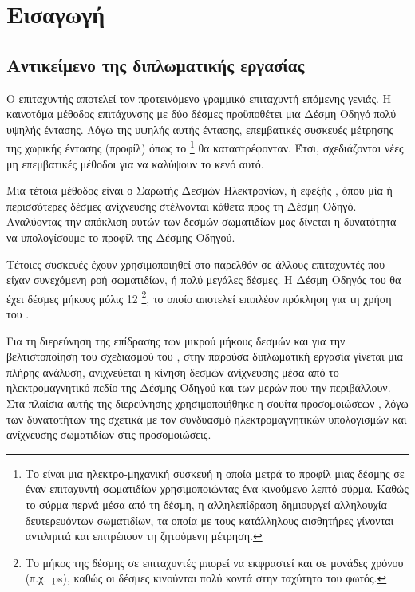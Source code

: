 \chapter{Εισαγωγή}


\epigraph{\textit{}}{}

\section{Αντικείμενο της διπλωματικής εργασίας}
Ο επιταχυντής  αποτελεί τον προτεινόμενο γραμμικό επιταχυντή επόμενης γενιάς.
Η καινοτόμα μέθοδος επιτάχυνσης με δύο δέσμες προϋποθέτει μια Δέσμη Οδηγό πολύ υψηλής έντασης.
Λόγω της υψηλής αυτής έντασης, επεμβατικές συσκευές μέτρησης της χωρικής έντασης (προφίλ) όπως το \footnote{Το  είναι μια ηλεκτρο-μηχανική συσκευή η οποία μετρά το προφίλ μιας δέσμης σε έναν επιταχυντή σωματιδίων χρησιμοποιώντας ένα κινούμενο λεπτό σύρμα.
Καθώς το σύρμα περνά μέσα από τη δέσμη, η αλληλεπίδραση δημιουργεί αλληλουχία δευτερευόντων σωματιδίων, τα οποία με τους κατάλληλους αισθητήρες γίνονται αντιληπτά και επιτρέπουν τη ζητούμενη μέτρηση.} θα καταστρέφονταν.
Έτσι, σχεδιάζονται νέες μη επεμβατικές μέθοδοι για να καλύψουν το κενό αυτό.

Μια τέτοια μέθοδος είναι ο Σαρωτής Δεσμών Ηλεκτρονίων, ή εφεξής , όπου μία ή περισσότερες δέσμες ανίχνευσης στέλνονται κάθετα προς τη Δέσμη Οδηγό.
Αναλύοντας την απόκλιση αυτών των δεσμών σωματιδίων μας δίνεται η δυνατότητα να υπολογίσουμε το προφίλ της Δέσμης Οδηγού.

Τέτοιες συσκευές έχουν χρησιμοποιηθεί στο παρελθόν σε άλλους επιταχυντές που είχαν συνεχόμενη ροή σωματιδίων, ή πολύ μεγάλες δέσμες.
Η Δέσμη Οδηγός του  θα έχει δέσμες μήκους μόλις 12 \footnote{Το μήκος της δέσμης σε επιταχυντές μπορεί να εκφραστεί και σε μονάδες χρόνου (π.χ.\ \si{\pico \second}), καθώς οι δέσμες κινούνται πολύ κοντά στην ταχύτητα του φωτός.}, το οποίο αποτελεί επιπλέον πρόκληση για τη χρήση του .

Για τη διερεύνηση της επίδρασης των μικρού μήκους δεσμών και για την βελτιστοποίηση του σχεδιασμού του , στην παρούσα διπλωματική εργασία γίνεται μια πλήρης ανάλυση,  ανιχνεύεται η κίνηση δεσμών ανίχνευσης μέσα από το ηλεκτρομαγνητικό πεδίο της Δέσμης Οδηγού και των μερών που την περιβάλλουν. 
Στα πλαίσια αυτής της διερεύνησης χρησιμοποιήθηκε η σουίτα προσομοιώσεων , λόγω των δυνατοτήτων της σχετικά με τον συνδυασμό ηλεκτρομαγνητικών υπολογισμών και ανίχνευσης σωματιδίων στις προσομοιώσεις.

